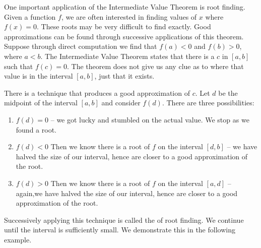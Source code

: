 One important application of the Intermediate Value Theorem is root finding. Given a function $f$, we are often interested in finding values of $x$ where $f(x) = 0$. These roots may be very difficult to find exactly. Good approximations can be found through successive applications of this theorem. Suppose through direct computation we find that $f(a) <0 $ and $f(b)>0$, where $a<b$. The Intermediate Value Theorem states that there is a $c$ in $[a,b]$ such that $f(c) = 0$. The theorem does not give us any clue as to where that value is in the interval $[a,b]$, just that it exists. 

There is a technique that produces a good approximation of $c$. Let $d$ be the midpoint of the interval $[a,b]$ and consider $f(d)$. There are three possibilities:
	\begin{enumerate} 
	\item		$f(d) = 0$ -- we got lucky and stumbled on the actual value. We stop as we found a root.
	\item		$f(d) <0$ Then we know there is a root of $f$ on the interval $[d,b]$ -- we have halved the size of our interval, hence are closer to a good approximation of the root.
	\item		$f(d) >0$ Then we know there is a root of $f$ on the interval $[a,d]$ -- again,we have halved the size of our interval, hence are closer to a good approximation of the root.
	\end{enumerate}

\enlargethispage{2\baselineskip}	
Successively applying this technique is called the   of root finding. We continue until the interval is sufficiently small. We demonstrate this in the following example.\\

